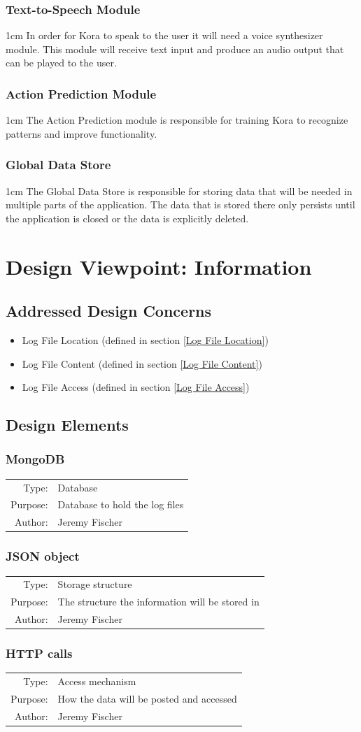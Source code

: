 \documentclass[onecolumn, draftclsnofoot,10pt, compsoc]{IEEEtran}
\def \botname{Kora\xspace}
\newenvironment{indentItem}[1][1cm]{\begin{adjustwidth}{#1}{}}{\end{adjustwidth}}
\newcommand{\designConcernRef}[1]{
    #1 (defined in section \ref{#1})
}
\newcommand{\designElementDef}[4]{
    \subsubsection{#1}\label{#1}
    \begin{tabular}[t]{r p{6in}}
        Type: & #2 \\
        Purpose: & #3 \\
        Author: & #4 \\
    \end{tabular}
}
\begin{document}
		\subsubsection{Text-to-Speech Module}
			\begin{indentItem}
				In order for \botname to speak to the user it will need a voice synthesizer module.
				This module will receive text input and produce an audio output that can be played to the user.
			\end{indentItem}		
		\subsubsection{Action Prediction Module}
			\begin{indentItem}
				The Action Prediction module is responsible for training \botname to recognize patterns and improve functionality.
			\end{indentItem}
		\subsubsection{Global Data Store}
			\begin{indentItem}
                The Global Data Store is responsible for storing data that will be needed in multiple parts of the application.
                The data that is stored there only persists until the application is closed or the data is explicitly deleted.
			\end{indentItem}
		
\section{Design Viewpoint: Information}
	\subsection{Addressed Design Concerns}
		\begin{itemize}
			\item \designConcernRef{Log File Location}
			\item \designConcernRef{Log File Content}
			\item \designConcernRef{Log File Access}
		\end{itemize}


	\subsection{Design Elements}
		\designElementDef{MongoDB}{Database}{Database to hold the log files}{Jeremy Fischer}
		\designElementDef{JSON object}{Storage structure}{The structure the information will be stored in}{Jeremy Fischer}
		\designElementDef{HTTP calls}{Access mechanism}{How the data will be posted and accessed}{Jeremy Fischer}
	
\end{document}

